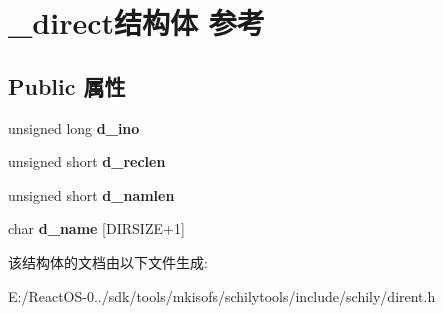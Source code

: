 \hypertarget{struct__direct}{}\section{\+\_\+direct结构体 参考}
\label{struct__direct}
\subsection*{Public 属性}
\begin{DoxyCompactItemize}
\item 
\mbox{\label{struct__direct_a6928fbb06a70e1709699cc67b0598ef5}} 
unsigned long {\bfseries d\+\_\+ino}
\item 
\mbox{\label{struct__direct_a9f2715e986eb68d08131e9c70ba6ee13}} 
unsigned short {\bfseries d\+\_\+reclen}
\item 
\mbox{\label{struct__direct_a54b662a0550a8e556439aa781ae7345c}} 
unsigned short {\bfseries d\+\_\+namlen}
\item 
\mbox{\label{struct__direct_aedbc07245dcf1a2eda76b119a75eacda}} 
char {\bfseries d\+\_\+name} \mbox{[}D\+I\+R\+S\+I\+ZE+1\mbox{]}
\end{DoxyCompactItemize}


该结构体的文档由以下文件生成\+:\begin{DoxyCompactItemize}
\item 
E\+:/\+React\+O\+S-\/0../sdk/tools/mkisofs/schilytools/include/schily/dirent.\+h\end{DoxyCompactItemize}
